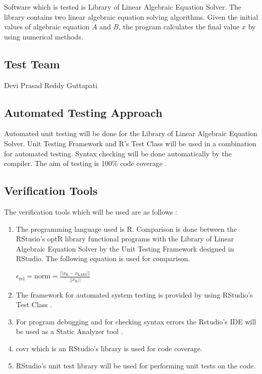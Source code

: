 \documentclass[12pt, titlepage]{article}
\begin{document}
Software which is tested is Library of Linear Algebraic Equation Solver. The
library contains two linear algebraic equation solving algorithms. Given the
initial values of algebraic equation $A$ and $B$, the program calculates the final
value $x$ by using numerical methods.

\subsection{Test Team}

Devi Prasad Reddy Guttapati

\subsection{Automated Testing Approach}

Automated unit testing will be done for the Library of Linear Algebraic Equation
Solver. Unit Testing Framework and R's Test Class will be used in a combination
for automated testing. Syntax checking will be done automatically by the
compiler. The aim of testing is 100\%  code coverage .

\subsection{Verification Tools}

The verification tools which will be used are as follows :

\begin{enumerate}

\item The programming language used is R. Comparison is done between the
RStusio's optR library functional programs with the Library of Linear Algebraic Equation
Solver by the Unit Testing Framework designed in RStudio. The following
equation is used for comparison.

\begin{center}
 $\epsilon_\text{rel} = \text{norm} = \frac{||x_\text{R} - x_\text{LAES}||}{||x_\text{R}||}$
\end{center}




\item The framework for automated system testing is provided by using RStudio's Test Class .

\item For program debugging and for checking syntax errors the Rstudio's IDE will be used as a Static Analyzer tool .

\item covr which is an RStudio's library is used for code coverage.

\item RStudio's unit test library will be used for performing unit tests on the code. 
\end{enumerate}
\end{document}
